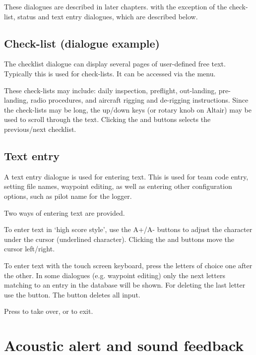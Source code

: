 These dialogues are described in later chapters. with the exception of the
check-list, status and text entry dialogues, which are described below.


\subsection*{Check-list (dialogue example)}\label{sec:checklist}

The checklist dialogue can display several pages of user-defined free text.
Typically this is used for check-lists. It can be accessed via the menu.
\begin{quote}
\blink{}
\end{quote}

These check-lists may include: daily inspection, preflight, out-landing,
pre-landing, radio procedures, and aircraft rigging and de-rigging
instructions.  Since the check-lists may be long, the up/down keys (or rotary
knob on Altair) may be used to scroll through the text. Clicking the
\button{$<$} and \button{$>$} buttons selects the previous/next checklist.


\subsection*{Text entry} \label{sec:textentry}

A text entry dialogue is used for entering text.  This is used for team
code entry, setting file names, waypoint editing, as well as entering
other configuration options, such as pilot name for the logger.

Two ways of entering text are provided. 

To enter text in `high score style', use the A+/A- buttons to adjust the 
character under the cursor (underlined character). Clicking the \button{$<$} 
and \button{$>$} buttons move the cursor left/right.  

To enter text with the touch screen keyboard, press the letters of choice 
one after the other. In some dialogues (e.g. waypoint editing) only the next 
letters matching to an entry in the database will be shown. For deleting the 
last letter use the \button{$<-$} button. The  button deletes all input.

Press  to take over, or  to exit.


\section{Acoustic alert and sound feedback}

